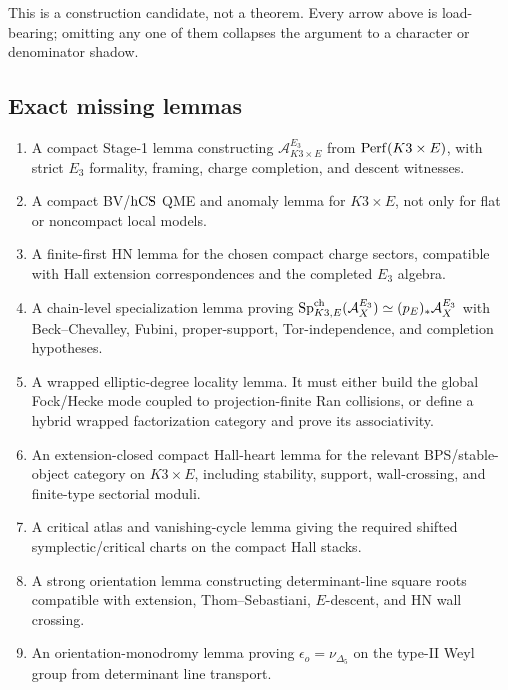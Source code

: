 This is a construction candidate, not a theorem.  Every arrow above is
load-bearing; omitting any one of them collapses the argument to a
character or denominator shadow.

\subsection{Exact missing lemmas}

\begin{enumerate}
\item A compact Stage-1 lemma constructing
\(\mathcal A_{K3\times E}^{E_3}\) from \(\mathrm{Perf}(K3\times E)\), with
strict \(E_3\) formality, framing, charge completion, and descent
witnesses.

\item A compact BV/\(\mathrm{hCS}\) QME and anomaly lemma for \(K3\times E\),
not only for flat or noncompact local models.

\item A finite-first HN lemma for the chosen compact charge sectors,
compatible with Hall extension correspondences and the completed
\(E_3\) algebra.

\item A chain-level specialization lemma proving
\(\mathrm{Sp}^{\mathrm{ch}}_{K3,E}(\mathcal A_X^{E_3})\simeq (p_E)_*\mathcal A_X^{E_3}\)
with Beck--Chevalley, Fubini, proper-support, Tor-independence, and
completion hypotheses.

\item A wrapped elliptic-degree locality lemma.  It must either build
the global Fock/Hecke mode coupled to projection-finite Ran collisions,
or define a hybrid wrapped factorization category and prove its
associativity.

\item An extension-closed compact Hall-heart lemma for the relevant
BPS/stable-object category on \(K3\times E\), including stability,
support, wall-crossing, and finite-type sectorial moduli.

\item A critical atlas and vanishing-cycle lemma giving the required
shifted symplectic/critical charts on the compact Hall stacks.

\item A strong orientation lemma constructing determinant-line square
roots compatible with extension, Thom--Sebastiani, \(E\)-descent, and
HN wall crossing.

\item An orientation-monodromy lemma proving
\(\epsilon_o=\nu_{\Delta_5}\) on the type-II Weyl group from determinant
line transport.


\end{enumerate}
